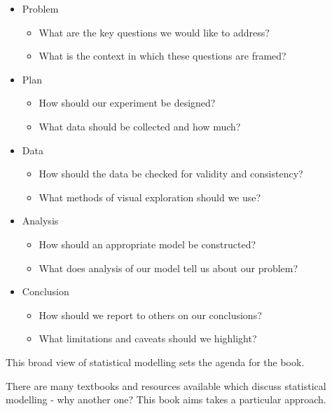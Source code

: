 \documentclass[
]{book}
\providecommand{\tightlist}{%
  \setlength{\itemsep}{0pt}\setlength{\parskip}{0pt}}
\begin{document}
\begin{itemize}
\tightlist
\item
  Problem

  \begin{itemize}
  \tightlist
  \item
    What are the key questions we would like to address?
  \item
    What is the context in which these questions are framed?
  \end{itemize}
\item
  Plan

  \begin{itemize}
  \tightlist
  \item
    How should our experiment be designed?
  \item
    What data should be collected and how much?
  \end{itemize}
\item
  Data

  \begin{itemize}
  \tightlist
  \item
    How should the data be checked for validity and consistency?
  \item
    What methods of visual exploration should we use?
  \end{itemize}
\item
  Analysis

  \begin{itemize}
  \tightlist
  \item
    How should an appropriate model be constructed?
  \item
    What does analysis of our model tell us about our problem?
  \end{itemize}
\item
  Conclusion

  \begin{itemize}
  \tightlist
  \item
    How should we report to others on our conclusions?
  \item
    What limitations and caveats should we highlight?
  \end{itemize}
\end{itemize}

This broad view of statistical modelling sets the agenda for the book.

There are many textbooks and resources available which discuss statistical modelling - why another one? This book aims takes a particular approach.
\end{document}
